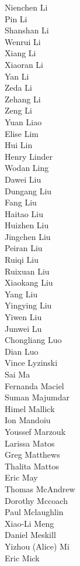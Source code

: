 Nienchen Li\\
Pin Li\\
Shanshan Li\\
Wenrui Li\\
Xiang Li\\
Xiaoran Li\\
Yan Li\\
Zeda Li\\
Zehang Li\\
Zeng Li\\
Yuan Liao\\
Elise Lim\\
Hui Lin\\
Henry Linder\\
Wodan Ling\\
Dawei Liu\\
Dungang Liu\\
Fang Liu\\
Haitao Liu\\
Huizhen Liu\\
Jingchen Liu\\
Peiran Liu\\
Ruiqi Liu\\
Ruixuan Liu\\
Xiaokang Liu\\
Yang Liu\\
Yingying Liu\\
Yiwen Liu\\
Junwei Lu\\
Chongliang Luo\\
Dian Luo\\
Vince Lyzinski\\
Sai Ma\\
Fernanda Maciel\\
Suman Majumdar\\
Himel Mallick\\
Ion Mandoiu\\
Youssef Marzouk\\
Larissa Matos\\
Greg Matthews\\
Thalita Mattos\\
Eric May\\
Thomas McAndrew\\
Dorothy Mccoach\\
Paul Mclaughlin\\
Xiao-Li Meng\\
Daniel Meskill\\
Yizhou (Alice) Mi\\
Eric Mick\\
